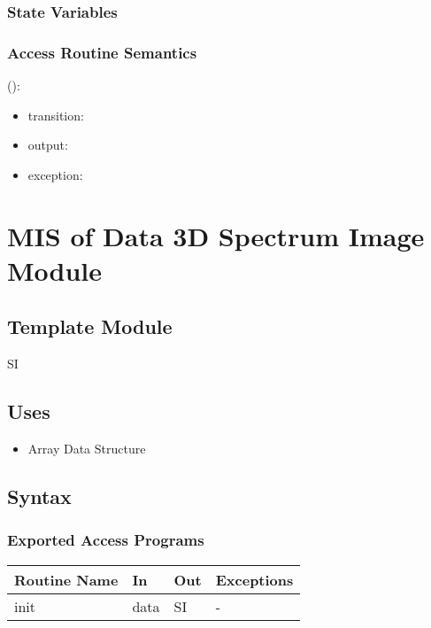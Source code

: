 \documentclass[12pt, titlepage]{article}
\begin{document}
\subsubsection{State Variables}


\subsubsection{Access Routine Semantics}

\noindent {}():
\begin{itemize}
\item transition: 
\item output:
\item exception:
\end{itemize}

\section{MIS of Data 3D Spectrum Image Module} \label{Mod:SI}

\subsection{Template Module}
SI

\subsection{Uses}
\begin{itemize}
	\item Array Data Structure
\end{itemize}


\subsection{Syntax}

\subsubsection{Exported Access Programs}

\begin{center}
\begin{tabular}{p{2cm} p{4cm} p{4cm} p{2cm}}
	\hline
	\textbf{Routine Name} & \textbf{In} & \textbf{Out} & \textbf{Exceptions} \\
	\hline
	 init & data & SI & - \\
	\hline
\end{tabular}
\end{center}
\end{document}
